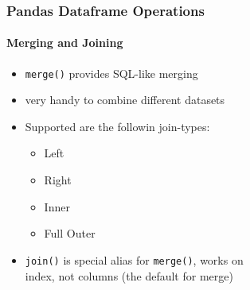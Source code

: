 \documentclass[12pt,ngerman]{beamer}
\begin{document}
%
%
%



\begin{frame}[fragile]
\frametitle{Pandas Dataframe Operations}
\framesubtitle{Merging and Joining}

\begin{itemize}
\item \texttt{merge()} provides SQL-like merging
\item very handy to combine different datasets
\item Supported are the followin join-types:
\begin{itemize}
	\item Left
	\item Right
	\item Inner
	\item Full Outer
\end{itemize}
\item \texttt{join()} is special alias for \texttt{merge()},  works on  \\ index, not columns  (the default for merge)
\end{itemize}

\end{frame}
\end{document}

